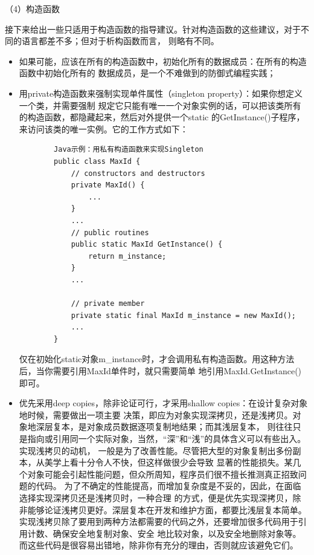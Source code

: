 \documentclass{article}
\begin{document}
\par
（4）构造函数
\par
接下来给出一些只适用于构造函数的指导建议。针对构造函数的这些建议，对于不同的语言都差不多；但对于析构函数而言，
则略有不同。
\begin{itemize}
    \item 如果可能，应该在所有的构造函数中，初始化所有的数据成员：在所有的构造函数中初始化所有的
    数据成员，是一个不难做到的防御式编程实践；
    \item 用private构造函数来强制实现单件属性（singleton property）：如果你想定义一个类，并需要强制
    规定它只能有唯一一个对象实例的话，可以把该类所有的构造函数，都隐藏起来，然后对外提供一个static
    的GetInstance()子程序，来访问该类的唯一实例。它的工作方式如下：
    \begin{lstlisting}
        Java示例：用私有构造函数来实现Singleton
        public class MaxId {
            // constructors and destructors
            private MaxId() {
                ...
            }
            ...
            // public routines
            public static MaxId GetInstance() {
                return m_instance;
            }
            ...

            // private member
            private static final MaxId m_instance = new MaxId();
            ...
        }
    \end{lstlisting}
    仅在初始化static对象m\_instance时，才会调用私有构造函数。用这种方法后，当你需要引用MaxId单件时，就只需要简单
    地引用MaxId.GetInstance()即可。
    \item 优先采用deep copies，除非论证可行，才采用shallow copies：在设计复杂对象地时候，需要做出一项主要
    决策，即应为对象实现深拷贝，还是浅拷贝。对象地深层复本，是对象成员数据逐项复制地结果；而其浅层复本，
    则往往只是指向或引用同一个实际对象，当然，“深”和“浅”的具体含义可以有些出入。实现浅拷贝的动机，
    一般是为了改善性能。尽管把大型的对象复制出多份副本，从美学上看十分令人不快，但这样做很少会导致
    显著的性能损失。某几个对象可能会引起性能问题，但众所周知，程序员们很不擅长推测真正招致问题的代码。
    为了不确定的性能提高，而增加复杂度是不妥的，因此，在面临选择实现深拷贝还是浅拷贝时，一种合理
    的方式，便是优先实现深拷贝，除非能够论证浅拷贝更好。深层复本在开发和维护方面，都要比浅层复本简单。
    实现浅拷贝除了要用到两种方法都需要的代码之外，还要增加很多代码用于引用计数、确保安全地复制对象、安全
    地比较对象，以及安全地删除对象等。而这些代码是很容易出错地，除非你有充分的理由，否则就应该避免它们。
\end{itemize}
\end{document}
